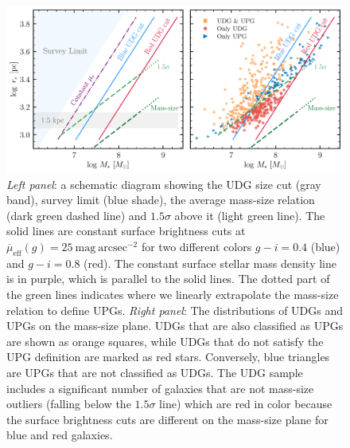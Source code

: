 \documentclass[twocolumn,astrosymb,twocolappendix,linenumbers]{aastex631}
\newcommand{\sbunit}{\mathrm{mag\ arcsec}^{-2}}
\newcommand{\sbeff}{\overline{\mu}_{\mathrm{eff}}(g)}
\begin{document}
\begin{CJK*}{UTF8}{gbsn}
\begin{figure}
	\vbox{ 
		\centering
		\includegraphics[width=1\linewidth]{mass_size_plane_new.pdf}
	}
    \caption{\textit{Left panel}: a schematic diagram showing the UDG size cut (gray band), survey limit (blue shade), the average mass-size relation (dark green dashed line) and $1.5\sigma$ above it (light green line). The solid lines are constant surface brightness cuts at $\sbeff=25\ \sbunit$ for two different colors $g-i=0.4$ (blue) and $g-i=0.8$ (red). The constant surface stellar mass density line is in purple, which is parallel to the solid lines. The dotted part of the green lines indicates where we linearly extrapolate the mass-size relation to define UPGs. \textit{Right panel}: The distributions of UDGs and UPGs on the mass-size plane. UDGs that are also classified as UPGs are shown as orange squares, while UDGs that do not satisfy the UPG definition are marked as red stars. Conversely, blue triangles are UPGs that are not classified as UDGs. The UDG sample includes a significant number of galaxies that are not mass-size outliers (falling below the $1.5\sigma$ line) which are red in color because the surface brightness cuts are different on the mass-size plane for blue and red galaxies.
    }
    \label{fig:mass_size}
\end{figure}


\end{CJK*}
\end{document}
